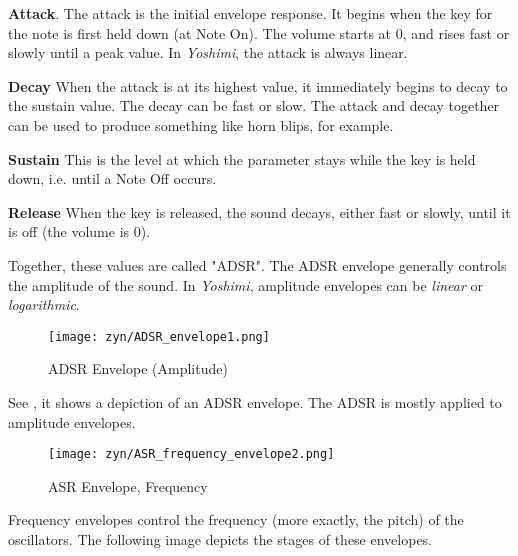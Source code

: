    \begin{enumber}
      \item \textbf{Attack}.
         \label{ref:attack}
         The attack is the initial envelope response.
         It begins when the key for the note is first held down
         (at Note On).
         The volume starts at 0, and rises fast or slowly until a peak value.
         In \textsl{Yoshimi}, the attack is always linear.
      \item \textbf{Decay}
         \label{ref:decay}
         When the attack is at its highest value, it immediately begins
         to decay to the sustain value.  The decay can be fast or slow.
         The attack and decay together can be used to produce something like
         horn blips, for example.
      \item \textbf{Sustain}
         \label{ref:sustain}
         This is the level at which the parameter stays while the key is
         held down, i.e. until a Note Off occurs.
      \item \textbf{Release}
         \label{ref:release}
         When the key is released, the sound decays, either fast or slowly,
         until it is off (the volume is 0).
   \end{enumber}

   Together, these values are called "ADSR".
   The ADSR envelope generally controls the amplitude of the sound.
   In \textsl{Yoshimi},
   amplitude envelopes can be \textsl{linear} or \textsl{logarithmic}.

\begin{figure}[H]
   \centering
   \texttt{[image: zyn/ADSR\_envelope1.png]}
   \caption{ADSR Envelope (Amplitude)}
   \label{fig:adsr_envelope_depiction}
\end{figure}

   See ,
   it shows a depiction of an ADSR envelope.
   The ADSR is mostly applied to amplitude envelopes.

\begin{figure}[H]
   \centering
   \texttt{[image: zyn/ASR\_frequency\_envelope2.png]}
   \caption{ASR Envelope, Frequency}
   \label{fig:asr_envelope_depiction}
\end{figure}

   Frequency envelopes control the frequency (more exactly, the pitch) of the
   oscillators. The following image depicts the stages of these envelopes.

